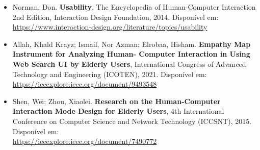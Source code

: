 \documentclass[12pt]{article}
\begin{document}
\begin{itemize}
    \item
    Norman, Don. \textbf{Usability}, The Encyclopedia of Human-Computer Interaction 2nd Edition, Interaction Design Foundation, 2014. Disponível em:   \\ 
    \url{https://www.interaction-design.org/literature/topics/usability}

    \item 
    Allah, Khald Krayz; Ismail, Nor Azman; Elrobaa, Hisham. \textbf{Empathy Map Instrument for Analyzing Human- Computer Interaction in Using Web Search UI by Elderly Users}, International Congress of Advanced Technology and Engineering (ICOTEN), 2021. Disponível em:	\\
    \url{https://ieeexplore.ieee.org/document/9493548}

    \item
    Shen, Wei; Zhou, Xiaolei. \textbf{Research on the Human-Computer Interaction Mode Design for Elderly Users}, 4th International Conference on Computer Science and Network Technology (ICCSNT), 2015. Disponível em:	\\
    \url{https://ieeexplore.ieee.org/document/7490772}
    

\end{itemize}
\end{document}
